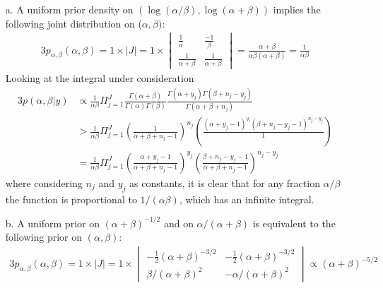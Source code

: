 \documentclass[12pt]{article}
\begin{document}
\begin{enumerate}
	\item[a.] A uniform prior density on $(\log(\alpha/\beta), \log(\alpha + \beta))$ implies the following joint distribution on ($\alpha, \beta)$:
	\begin{alignat*}{3}
	p_{\alpha,\beta}(\alpha, \beta)=1 \times |J| = 1 \times \begin{vmatrix}
	\frac{1}{\alpha}& \frac{-1}{\beta}\\
	\frac{1}{\alpha+\beta}& \frac{1}{\alpha+\beta}
	\end{vmatrix}
	=\frac{\alpha+\beta}{\alpha\beta(\alpha+\beta)}=\frac{1}{\alpha \beta}
	\end{alignat*}
	Looking at the integral under consideration
	\begin{alignat*}{3}
	p(\alpha, \beta | y) & \propto \frac{1}{\alpha \beta}\Pi_{j=1}^J \frac{\Gamma(\alpha + \beta)}{\Gamma(\alpha)\Gamma(\beta)}\frac{\Gamma(\alpha+y_j)\Gamma(\beta + n_j - y_j)}{\Gamma(\alpha + \beta + n_j)} \\
	& > \frac{1}{\alpha \beta}\Pi_{j=1}^J \left(\frac{1}{\alpha + \beta + n_j -1}\right)^{n_j} \left(\frac{(\alpha + y_j - 1)^{y_i}(\beta + n_j - y_j -1)^{n_j-y_j}}{1}\right) \\
	& = \frac{1}{\alpha \beta}\Pi_{j=1}^J \left(\frac{\alpha + y_j -1}{\alpha + \beta + n_j -1}\right)^{y_j} \left(\frac{\beta + n_j - y_j -1}{\alpha + \beta + n_j -1}\right)^{n_j - y_j}
	\end{alignat*}
	where considering $n_j$ and $y_j$ as constants, it is clear that for any fraction $\alpha/\beta$ the function is proportional to $1/(\alpha \beta)$, which has an infinite integral.
	\item[b.] A uniform prior on $(\alpha + \beta)^{-1/2}$ and on $\alpha / (\alpha + \beta)$ is equivalent to the following prior on $(\alpha, \beta)$:
	\begin{alignat*}{3}
	p_{\alpha, \beta}(\alpha, \beta)=1 \times |J| = 1 \times
	\begin{vmatrix}
	-\frac{1}{2}(\alpha + \beta)^{-3/2}& 	-\frac{1}{2}(\alpha + \beta)^{-3/2}\\
	\beta/(\alpha+\beta)^2& -\alpha/(\alpha+\beta)^2
	\end{vmatrix}
	\propto (\alpha + \beta)^{-5/2}
	\end{alignat*}
\end{enumerate}
\end{document}
